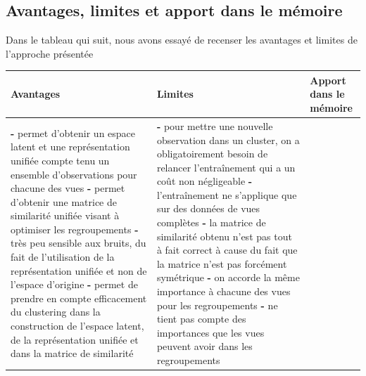 \documentclass[12pt, french, latin.medieval, a4paper]{report}
\begin{document}
    	\subsection{Avantages, limites et apport dans le mémoire}
        	Dans le tableau qui suit, nous avons essayé de recenser les avantages et limites de l'approche présentée
        	\begin{center}
            	\begin{longtable}{|p{5cm}|p{5cm}|p{4.5cm}|} \hline
                	{Avantages} & {Limites} & {Apport dans le mémoire} \\
                	\hline
                    	{\textbf{-} permet d'obtenir un espace latent et une représentation unifiée compte tenu un ensemble d'observations pour chacune des vues} \newline\newline
                    	{\textbf{-} permet d'obtenir une matrice de similarité unifiée visant à optimiser les regroupements} \newline\newline
                    	{\textbf{-} très peu sensible aux bruits, du fait de l'utilisation de la représentation unifiée et non de l'espace d'origine} \newline\newline
                    	{\textbf{-} permet de prendre en compte efficacement du clustering dans la construction de l'espace latent, de la représentation unifiée et dans la matrice de similarité}
                    	&
                    	{\textbf{-} pour mettre une nouvelle observation dans un cluster, on a obligatoirement besoin de relancer l'entraînement qui a un coût non négligeable } \newline\newline
                    	{\textbf{-} l'entraînement ne s'applique que sur des données de vues complètes} \newline\newline
                    	{\textbf{-} la matrice de similarité obtenu n'est pas tout à fait correct à cause du fait que la matrice n'est pas forcément symétrique} \newline\newline
                    	{\textbf{-} on accorde la même importance à chacune des vues pour les regroupements} \newline\newline
                    	{\textbf{-} ne tient pas compte des importances que les vues peuvent avoir dans les regroupements } \newline\newline

\end{longtable}
\end{center}
\end{document}
